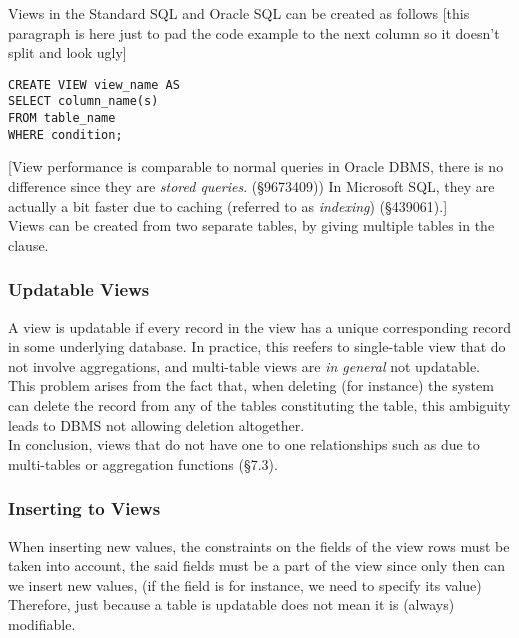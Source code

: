 \documentclass[11pt,a4paper,twocolumn]{book}
\begin{document}
Views in the Standard SQL and Oracle SQL can be created as follows [this paragraph is here just to pad the code example to the next column so it doesn't split and look ugly]

\begin{lstlisting}
CREATE VIEW view_name AS
SELECT column_name(s)
FROM table_name
WHERE condition;
\end{lstlisting}

[View performance is comparable to normal queries in Oracle DBMS, there is no difference since they are \textit{stored queries}. (\S9673409)) In Microsoft SQL, they are actually a bit faster due to caching (referred to as \textit{indexing}) (\S439061).]\\

Views can be created from two separate tables, by giving multiple tables in the  clause.\\


\subsubsection{Updatable Views}

A view is updatable if every record in the view has a unique corresponding record in some underlying database. In practice, this reefers to single-table view that do not involve aggregations, and multi-table views are \textit{in general} not updatable.\\

This problem arises from the fact that, when deleting (for instance) the system can delete the record from any of the tables constituting the table, this ambiguity leads to DBMS not allowing deletion altogether.\\

In conclusion, views that do not have one to one relationships such as due to multi-tables or aggregation functions (\S7.3).

\subsubsection{Inserting to Views}

When inserting new values, the constraints on the fields of the view rows must be taken into account, the said fields must be a part of the view since only then can we insert new values, (if the field is  for instance, we need to specify its value) Therefore, just because a table is updatable does not mean it is (always) modifiable.
\end{document}
